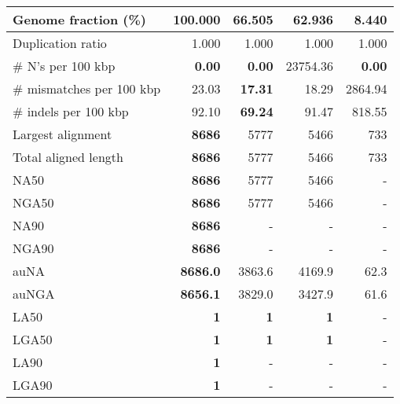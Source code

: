 \documentclass[12pt,a4paper]{article}
\begin{document}
\begin{table}[ht]
\begin{center}
\begin{tabular}{|l*{4}{|r}|}
Genome fraction (\%) & {\bf 100.000} & 66.505 & 62.936 & 8.440 \\ \hline
Duplication ratio & 1.000 & 1.000 & 1.000 & 1.000 \\ \hline
\# N's per 100 kbp & {\bf 0.00} & {\bf 0.00} & 23754.36 & {\bf 0.00} \\ \hline
\# mismatches per 100 kbp & 23.03 & {\bf 17.31} & 18.29 & 2864.94 \\ \hline
\# indels per 100 kbp & 92.10 & {\bf 69.24} & 91.47 & 818.55 \\ \hline
Largest alignment & {\bf 8686} & 5777 & 5466 & 733 \\ \hline
Total aligned length & {\bf 8686} & 5777 & 5466 & 733 \\ \hline
NA50 & {\bf 8686} & 5777 & 5466 & - \\ \hline
NGA50 & {\bf 8686} & 5777 & 5466 & - \\ \hline
NA90 & {\bf 8686} & - & - & - \\ \hline
NGA90 & {\bf 8686} & - & - & - \\ \hline
auNA & {\bf 8686.0} & 3863.6 & 4169.9 & 62.3 \\ \hline
auNGA & {\bf 8656.1} & 3829.0 & 3427.9 & 61.6 \\ \hline
LA50 & {\bf 1} & {\bf 1} & {\bf 1} & - \\ \hline
LGA50 & {\bf 1} & {\bf 1} & {\bf 1} & - \\ \hline
LA90 & {\bf 1} & - & - & - \\ \hline
LGA90 & {\bf 1} & - & - & - \\ \hline
\end{tabular}
\end{center}
\end{table}
\end{document}
